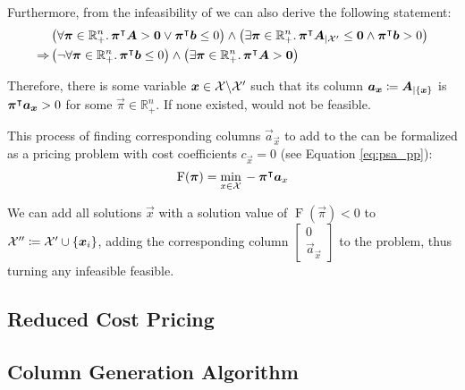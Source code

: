 Furthermore, from the infeasibility of \RMP{} we can also derive the following statement:
\begin{equation}
\begin{aligned}
& \left( \forall {\bm{\pi}} \in \mathbb{R}_+^n. \, {\bm{\pi}}^\intercal {\bm{A}} > {\bm{0}} \lor {\bm{\pi}}^\intercal {\bm{b}} \leq 0 \right) \land \left( \exists {\bm{\pi}} \in \mathbb{R}_+^n. \, {\bm{\pi}}^\intercal {\bm{A}}_{\vert \mathcal{X}'} \leq {\bm{0}} \land {\bm{\pi}}^\intercal {\bm{b}} > 0 \right) \\
\Rightarrow & \left( \neg \forall {\bm{\pi}} \in \mathbb{R}_+^n. \, {\bm{\pi}}^\intercal {\bm{b}} \leq 0 \right) \land \left( \exists {\bm{\pi}} \in \mathbb{R}_+^n. \, {\bm{\pi}}^\intercal {\bm{A}} > {\bm{0}} \right)
\end{aligned}
\end{equation}

Therefore, there is some variable ${\bm{x}} \in \mathcal{X} \backslash \mathcal{X}'$ such that its column ${\bm{a}}_{\bm{x}} \coloneqq {\bm{A}}_{\vert \{{\bm{x}}\}}$ is ${\bm{\pi}}^\intercal {\bm{a}}_{\bm{x}} > 0$ for some $\vec{\pi} \in \mathbb{R}_+^n$. If none existed, \MP{} would not be feasible.

This process of finding corresponding columns $\vec{a}_\vec{x}$ to add to the \RMP{} can be formalized as a pricing problem with cost coefficients $c_\vec{x} = 0$ (see Equation \eqref{eq:psa_pp}):
\begin{equation}
\operatorname{F}({\bm{\pi}}) = \underset{x \in \mathcal{X}}{\min} \, -{\bm{\pi}}^\intercal {\bm{a}}_x
\end{equation}

We can add all solutions $\vec{x}$ with a solution value of $\operatorname{F}(\vec{\pi}) < 0$ to $\mathcal{X}'' \coloneqq \mathcal{X}' \cup \{{\bm{x}}_i\}$, adding the corresponding column $\begin{bmatrix}0 \\ \vec{a}_\vec{x} \end{bmatrix}$ to the problem, thus turning any infeasible \RMP{} feasible.

\subsection{Reduced Cost Pricing}\label{sec:cg_bp_cg_reduced}

\subsection{Column Generation Algorithm}\label{sec:cg_bp_cg_alg}

